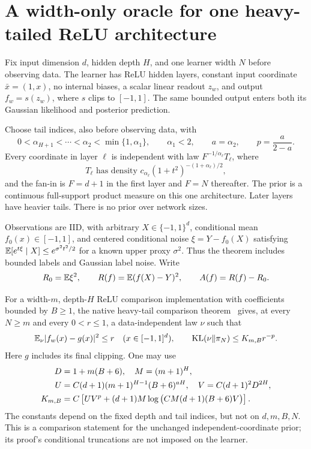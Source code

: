 \section{A width-only oracle for one heavy-tailed ReLU architecture}
\label{sec:relu-width-only}
Fix input dimension $d$, hidden depth $H$, and one learner width $N$ before observing data. The learner has ReLU hidden layers, constant input coordinate $\bar x=(1,x)$, no internal biases, a scalar linear readout $z_w$, and output
$f_w=s(z_w)$, where $s$ clips to $[-1,1]$. The same bounded output enters both its Gaussian likelihood and posterior prediction.

Choose tail indices, also before observing data, with
\[
 0<\alpha_{H+1}<\cdots<\alpha_2<\min\{1,\alpha_1\},
 \qquad \alpha_1<2,
 \qquad a=\alpha_2,\qquad p=\frac a{2-a}.
\]
Every coordinate in layer $\ell$ is independent with law $F^{-1/\alpha_\ell}T_\ell$, where
\[
 T_\ell\text{ has density }c_{\alpha_\ell}
       (1+t^2)^{-(1+\alpha_\ell)/2},
\]
and the fan-in is $F=d+1$ in the first layer and $F=N$ thereafter. The prior is a continuous full-support product measure on this one architecture. Later layers have heavier tails. There is no prior over network sizes.

Observations are IID, with arbitrary $X\in\{-1,1\}^d$, conditional mean $f_0(x)\in[-1,1]$, and centered conditional noise $\xi=Y-f_0(X)$ satisfying
$\mathbb E[e^{t\xi}\mid X]\le e^{\sigma^2t^2/2}$ for a known upper proxy $\sigma^2$. Thus the theorem includes bounded labels and Gaussian label noise. Write
\[
 R_0=\mathbb E\xi^2,\qquad R(f)=\mathbb E(f(X)-Y)^2,
 \qquad A(f)=R(f)-R_0.
\]

For a width-$m$, depth-$H$ ReLU comparison implementation with coefficients bounded by $B\ge1$, the native heavy-tail comparison theorem~\cite{layerwise} gives, at every $N\ge m$ and every $0<r\le1$, a data-independent law $\nu$ such that
\begin{equation}
 \mathbb E_\nu|f_w(x)-g(x)|^2\le r\quad(x\in[-1,1]^d),
 \qquad \operatorname{KL}(\nu\|\pi_N)\le K_{m,B}r^{-p}.
 \label{eq:layerwise-L2-comparison}
\end{equation}
Here $g$ includes its final clipping. One may use
\begin{align}
 D&=1+m(B+6),\quad M=(m+1)^H,\notag\\
 U&=C(d+1)(m+1)^{H-1}(B+6)^{aH},
 \quad V=C(d+1)^2D^{2H},\notag\\
 K_{m,B}&=C\left[UV^p+(d+1)M
       \log\big(CM(d+1)(B+6)V\big)\right].
 \label{eq:layerwise-compiled-resource}
\end{align}
The constants depend on the fixed depth and tail indices, but not on $d,m,B,N$. This is a comparison statement for the unchanged independent-coordinate prior; its proof's conditional truncations are not imposed on the learner.

